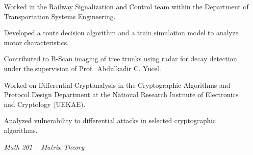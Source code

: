   \begin{Highlights}
    \item Worked in the Railway Signalization and Control team within the Department of Transportation Systems Engineering.
    \item Developed a route decision algorithm and a train simulation model to analyze motor characteristics.
  \end{Highlights}

  \begin{Highlights}
    \item Contributed to B-Scan imaging of tree trunks using radar for decay detection under the supervision of Prof.~Abdulkadir C. Yucel.
  \end{Highlights}

  \begin{Highlights}
    \item Worked on Differential Cryptanalysis in the Cryptographic Algorithms and Protocol Design Department at the National Research Institute of Electronics and Cryptology (UEKAE).
    \item Analyzed vulnerability to differential attacks in selected cryptographic algorithms.
  \end{Highlights}

  \begin{Highlights}
    \item \emph{Math 201 -- Matrix Theory}
  \end{Highlights}
